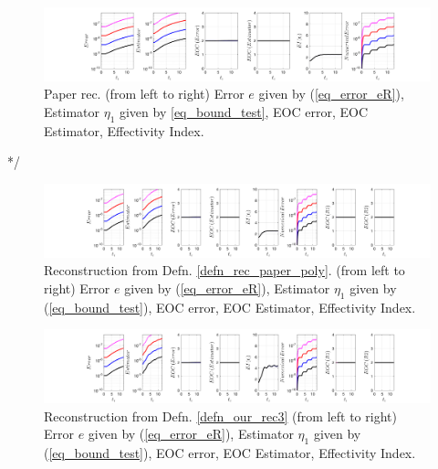 \documentclass[12pt,a4paper]{article}
\numberwithin{equation}{section}
\theoremstyle{definition}
\begin{document}
\begin{figure}[H]
	\hspace{-3cm}
	\includegraphics[scale=0.55]{fig_LeapFrogplots_1x5_sin_IC_harmonic_u2_v8_paperrec}	
	\caption{Paper rec. (from left to right) Error $e$ given by (\ref{eq_error_eR}), Estimator $\eta_1$ given by \ref{eq_bound_test},   EOC error, EOC Estimator, Effectivity Index.}
	\label{fig_all_in_one_paperrec_u02_v08}
\end{figure}
*/
\begin{figure}[H]
	\hspace{-3cm}
	\includegraphics[scale=0.55]{fig_LeapFrogplots_1x5_sin_IC_harmonic_u2_v8_paperrec_poly_our_res}	
		\caption{Reconstruction from Defn. \ref{defn_rec_paper_poly}. (from left to right) Error $e$ given by (\ref{eq_error_eR}), Estimator $\eta_1$ given by (\ref{eq_bound_test}), EOC error, EOC Estimator, Effectivity Index.}
	\label{fig_all_in_one_paperrec_poly_u02_v08}
\end{figure}

\begin{figure}[H]
	\hspace{-3cm}
	\includegraphics[scale=0.55]{fig_LeapFrogplots_1x5_sin_IC_harmonic_u2_v8_paperrec_poly_tristan}	
	\caption{Reconstruction from Defn. \ref{defn_our_rec3} (from left to right) Error $e$ given by (\ref{eq_error_eR}), Estimator $\eta_1$ given by (\ref{eq_bound_test}), EOC error, EOC Estimator, Effectivity Index.}
	\label{fig_all_in_one_paperrec_poly_tristan_u2_v8}
\end{figure}
\end{document}
